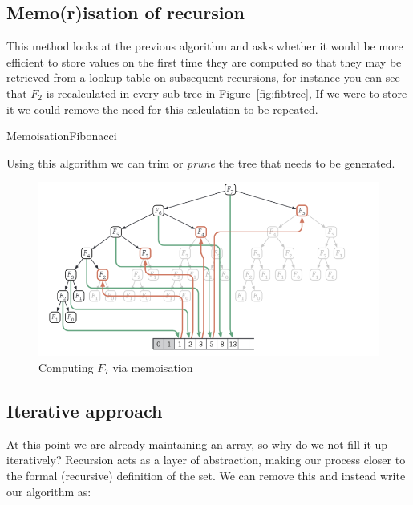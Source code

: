 \documentclass{article}
\begin{document}
\subsection{Memo(r)isation of recursion}

This method looks at the previous algorithm and asks whether it would be more efficient to store values on the first time they are computed so that they may be retrieved from a lookup table on subsequent recursions, for instance you can see that $F_{2}$ is recalculated in every sub-tree in Figure~\ref{fig:fibtree}, If we were to store it we could remove the need for this calculation to be repeated.

\begin{algorithm}
  \caption{MemoisationFibonacci}
\end{algorithm}

Using this algorithm we can trim or \textit{prune} the tree that needs to be generated.

\begin{figure}[ht]
  \centering
  \includegraphics[scale=0.5]{figures/l9-2.png}
  \caption{\label{fig:memfib} Computing $F_{7}$ via memoisation}
\end{figure}

\subsection{Iterative approach}

At this point we are already maintaining an array, so why do we not fill it up iteratively? Recursion acts as a layer of abstraction, making our process closer to the formal (recursive) definition of the set. We can remove this and instead write our algorithm as:
\end{document}
